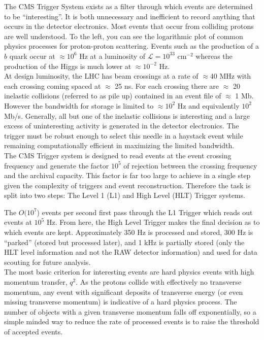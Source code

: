 The CMS Trigger System exists as a filter through which events are determined to be ``interesting''. 
It is both  unnecessary and inefficient to record anything that occurs in the detector electronics. 
Most events that occur from colliding protons are well understood. To the left, you can see the 
logarithmic plot of common physics processes for proton-proton scattering. Events such as the production 
of a $b$ quark  occur at $\approx 10^6$ Hz at a luminosity of $\mathcal{L} = 10^{33}$ cm$^{-2}$ 
whereas the production of the Higgs is much lower at $\approx 10^{-2}$ Hz.  \\

At design luminosity, the LHC has beam crossings at a rate of $\approx 40$ MHz with 
each crossing coming spaced at $\approx$ 25 ns. 
For each crossing there are $\approx$ 20 inelastic collisions (referred to as pile up) 
contained in an event file of $\approx$ 1 Mb. 
However the bandwidth for storage is limited to $\approx 10^2$ Hz and equivalently $10^2$ Mb/s. 
Generally, all but one of the inelastic collisions is interesting and a large excess of uninteresting 
activity is generated in the detector electronics. The trigger must be robust enough to select 
this needle in a haystack event while remaining computationally efficient in maximizing the limited bandwidth.  \\

The CMS Trigger system is designed to read events at the event crossing frequency and generate the
 factor $10^5$ of rejection between the crossing frequency and the archival capacity. This factor 
is far too large to achieve in a single step given the complexity of triggers and event reconstruction. 
Therefore the task is split into two steps: The Level 1 (L1) and High Level (HLT) Trigger systems.

The $O(10^7$) events per second first pass through the L1 Trigger which reads out events at $10^5$ Hz. 
From here, the High Level Trigger makes the final decision as to which events are kept. 
Approximately 350 Hz is processed and stored, 300 Hz is ``parked'' (stored but processed later), 
and 1 kHz is partially stored (only the HLT level information and not the RAW detector information) 
and used for data scouting for future analysis.  \\

The most basic criterion for interesting events are hard physics events with high momentum transfer, $q^2$.
 As the protons collide with effectively no transverse momentum, any event with significant deposits of 
transverse energy (or even missing transverse momentum) is indicative of a hard physics process. 
The number of objects with a given transverse momentum falls off exponentially, so a simple minded way to
  reduce the rate of processed events is to raise the threshold of accepted events. \\


